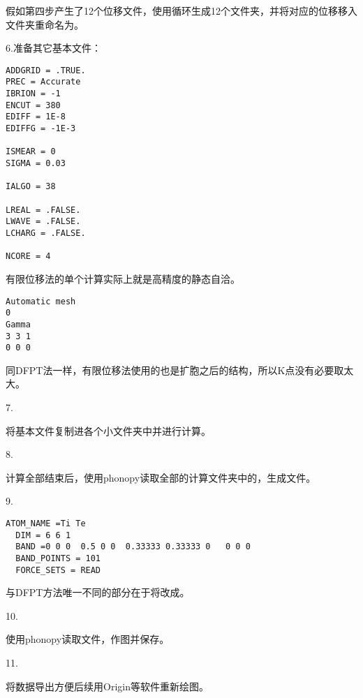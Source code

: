 假如第四步产生了12个位移文件，使用循环生成12个文件夹，并将对应的位移移入文件夹重命名为。

6.准备其它基本文件：

\begin{lstlisting}[caption=INCAR]
ADDGRID = .TRUE.
PREC = Accurate
IBRION = -1
ENCUT = 380
EDIFF = 1E-8
EDIFFG = -1E-3

ISMEAR = 0
SIGMA = 0.03

IALGO = 38

LREAL = .FALSE.
LWAVE = .FALSE.
LCHARG = .FALSE.

NCORE = 4
\end{lstlisting}

\begin{attention}
 有限位移法的单个计算实际上就是高精度的静态自洽。
\end{attention}

\begin{lstlisting}[caption=KPOINTS]
Automatic mesh
0
Gamma
3 3 1
0 0 0
\end{lstlisting}

\begin{attention}
 同DFPT法一样，有限位移法使用的也是扩胞之后的结构，所以K点没有必要取太大。
\end{attention}

7.

将基本文件复制进各个小文件夹中并进行计算。

8.

计算全部结束后，使用phonopy读取全部的计算文件夹中的，生成文件。

9.

\begin{lstlisting}[caption=band.conf]
  ATOM_NAME =Ti Te
  DIM = 6 6 1
  BAND =0 0 0  0.5 0 0  0.33333 0.33333 0   0 0 0
  BAND_POINTS = 101
  FORCE_SETS = READ
\end{lstlisting}

与DFPT方法唯一不同的部分在于将改成。

10.

使用phonopy读取文件，作图并保存。

11.

将数据导出方便后续用Origin等软件重新绘图。
